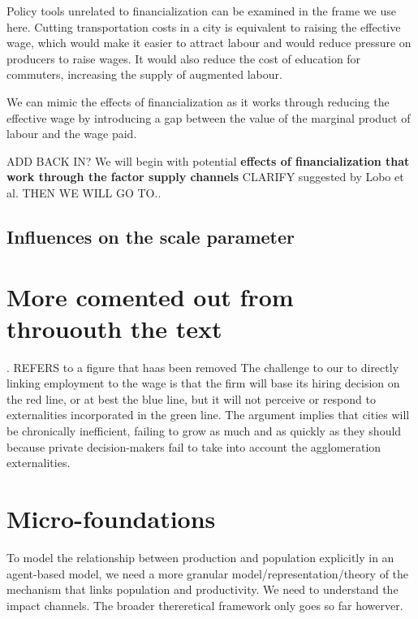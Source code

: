 \documentclass[a4paper]{article}
\theoremstyle{definition}
\theoremstyle{plain}
\begin{document}
{Policy tools unrelated to financialization can be examined in the frame we use here. Cutting transportation costs in a city is equivalent to raising the effective wage, which would  make it easier to attract labour and would reduce pressure on producers to raise wages. It would also reduce the cost of education for commuters, increasing the supply of augmented labour.

 We can mimic the effects of financialization as it works through reducing the effective wage by introducing a gap between the value of the marginal product of labour and the wage paid. 

ADD BACK IN? We will begin with potential \textbf{effects of financialization  that work through the factor supply channels} CLARIFY suggested by Lobo et al.  THEN WE WILL GO TO..

\subsection{Influences on the scale parameter} 

\section{More comented out from thrououth the text}






.  REFERS to a figure that haas been removed
The challenge to our to directly linking employment to the wage is that the firm will base its hiring decision on the red line, or at best the blue line, but it will not perceive or  respond to externalities incorporated in the green line.  The argument implies  that cities will be chronically inefficient, failing to grow as  much and as quickly as they should because private decision-makers fail to take into account the agglomeration externalities. 

\section{Micro-foundations} %
To model the relationship between production and population explicitly in an agent-based model, we need a more granular model/representation/theory of the mechanism that links population and productivity. We need to understand the impact channels. 
The broader thereretical framework only goes so far howerver. 

}
\end{document}
